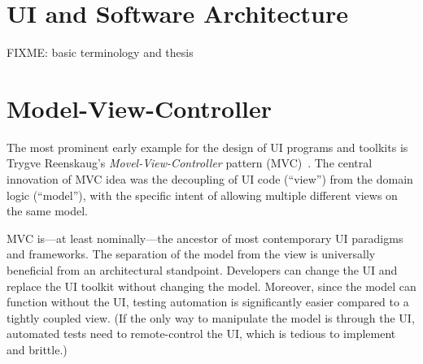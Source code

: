 \documentclass[sigplan,screen]{acmart}
\begin{document}



\maketitle

\section{UI and Software Architecture}

FIXME: basic terminology and thesis


\section{Model-View-Controller}


The most prominent early example for the design of UI programs and
toolkits is Trygve Reenskaug's \textit{Movel-View-Controller} pattern
(MVC)~\cite{MVC}.  The central innovation of MVC idea was the
decoupling of UI code (``view'') from the domain logic (``model''),
with the specific intent of allowing multiple different views on the
same model.

MVC is---at least nominally---the ancestor of most contemporary UI
paradigms and frameworks.  The separation of the model from the view
is universally beneficial from an architectural standpoint.
Developers can change the UI and replace the UI toolkit without
changing the model.  Moreover, since the model can function without
the UI, testing automation is significantly easier compared to a
tightly coupled view.  (If the only way to manipulate the model is
through the UI, automated tests need to remote-control the UI, which
is tedious to implement and brittle.)
\end{document}
